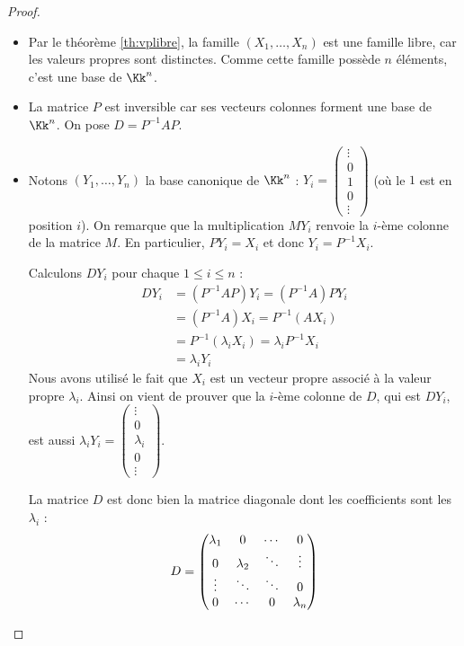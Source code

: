 \documentclass[11pt, class=report,crop=false]{standalone}
\begin{document}
\begin{proof}~

\begin{itemize}
  \item Par le théorème \ref{th:vplibre}, la famille $(X_1,\ldots,X_n)$ est une famille libre, car les valeurs propres sont distinctes. Comme cette famille possède $n$ éléments, c'est une base de $\Kk^n$.
  
  \item La matrice $P$ est inversible car ses vecteurs colonnes forment une base de $\Kk^n$.
  On pose $D=P^{-1}AP$.
  
  \item Notons $(Y_1,\ldots,Y_n)$ la base canonique de $\Kk^n$ :  $Y_i = \left(\begin{smallmatrix}\vdots\\0\\1\\0 \\\vdots\end{smallmatrix}\right)$ (où le $1$ est en position $i$).
 On remarque que la multiplication $M Y_i$ renvoie la $i$-ème colonne de la matrice $M$. En particulier, $PY_i = X_i$ et donc $Y_i = P^{-1}X_i$. 
  
  Calculons $DY_i$ pour chaque $1\le i \le n$ :  
  \begin{align*}
  DY_i & = (P^{-1}AP) Y_i 
        = (P^{-1}A)P Y_i \\
       & = (P^{-1}A)X_i 
        = P^{-1} (AX_i) \\
       & = P^{-1} (\lambda_i X_i) 
        = \lambda_i P^{-1} X_i \\
       &= \lambda_i Y_i
  \end{align*}
  Nous avons utilisé le fait que $X_i$ est un vecteur propre associé à la valeur propre $\lambda_i$.
  Ainsi on vient de prouver que la $i$-ème colonne de $D$, qui est $DY_i$, est aussi
  $\lambda_i Y_i = \left(\begin{smallmatrix}\vdots\\0\\\lambda_i\\0 \\\vdots\end{smallmatrix}\right)$.
  
  La matrice $D$ est donc bien la matrice diagonale dont les coefficients sont les $\lambda_i$ :
  $$D = \begin{pmatrix}
\lambda_{1}&0&\cdots&0 \cr
0&\lambda_{2}&\ddots&\vdots\cr
\vdots&\ddots& \ddots &0\cr
0&\cdots&0& \lambda_{n}
\end{pmatrix}$$ 
\end{itemize}

\end{proof}
\end{document}
